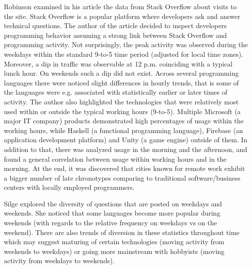Robinson \cite{Rob17LangsUsedAtNight} examined in his article the data from Stack Overflow about visits to the site. Stack Overflow is a popular platform where developers ask and answer technical questions. The author of the article decided to inspect developers programming behavior assuming a strong link between Stack Overflow and programming activity. Not surprisingly, the peak activity was observed during the weekdays within the standard 9-to-5 time period (adjusted for local time zones). Moreover, a dip in traffic was observable at 12 p.m. coinciding with a typical lunch hour. On weekends such a dip did not exist. Across several programming languages there were noticed slight differences in hourly trends, that is some of the languages were e.g. associated with statistically earlier or later times of activity. The author also highlighted the technologies that were relatively most used within or outside the typical working hours (9-to-5). Multiple Microsoft (a major IT company) products demonstrated high percentages of usage within the working hours, while Haskell (a functional programming language), Firebase (an application development platform) and Unity (a game engine) outside of them. In addition to that, there was analyzed usage in the morning and the afternoon, and found a general correlation between usage within working hours and in the morning. At the end, it was discovered that cities known for remote work exhibit a bigger number of late chronotypes comparing to traditional software/business centers with locally employed programmers.

Silge \cite{Sil17LangsUsedOnWeekends} explored the diversity of questions that are posted on weekdays and weekends. She noticed that some languages become more popular during weekends (with regards to the relative frequency on weekdays vs on the weekend). There are also trends of diversion in these statistics throughout time which may suggest maturing of certain technologies (moving activity from weekends to weekdays) or going more mainstream with hobbyists (moving activity from weekdays to weekends).
